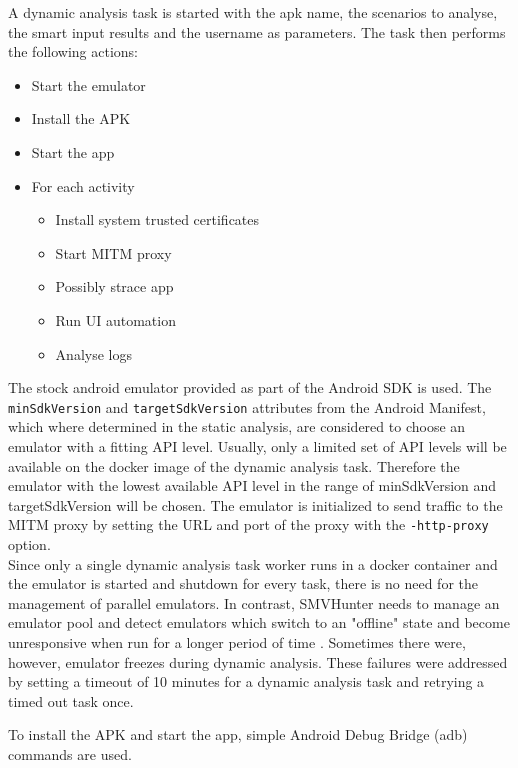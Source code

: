\documentclass[draft,final]{vutinfth} %
\begin{document}
A dynamic analysis task is started with the apk name, the scenarios to analyse, the smart input results and the username as parameters.
The task then performs the following actions:
\begin{itemize}
\item Start the emulator
\item Install the APK
\item Start the app
\item For each activity
	\begin{itemize}
	\item Install system trusted certificates
	\item Start MITM proxy
	\item Possibly strace app
	\item Run UI automation
	\item Analyse logs
	\end{itemize}
\end{itemize}
The stock android emulator provided as part of the Android SDK is used. The \texttt{minSdkVersion} and \texttt{targetSdkVersion} attributes from the Android Manifest, which where determined in the static analysis, are considered to choose an emulator with a fitting API level. Usually, only a limited set of API levels will be available on the docker image of the dynamic analysis task. Therefore the emulator with the lowest available API level in the range of minSdkVersion and targetSdkVersion will be chosen. The emulator is initialized to send traffic to the MITM proxy by setting the URL and port of the proxy with the \texttt{-http-proxy} option.\\
Since only a single dynamic analysis task worker runs in a docker container and the emulator is started and shutdown for every task, there is no need for the management of parallel emulators. In contrast, SMVHunter needs to manage an emulator pool and detect emulators which switch to an "offline" state and become unresponsive when run for a longer period of time \cite{Sounthiraraj}. Sometimes there were, however, emulator freezes during dynamic analysis. These failures were addressed by setting a timeout of 10 minutes for a dynamic analysis task and retrying a timed out task once.

To install the APK and start the app, simple Android Debug Bridge (adb) \cite{Adb} commands are used.
\end{document}
